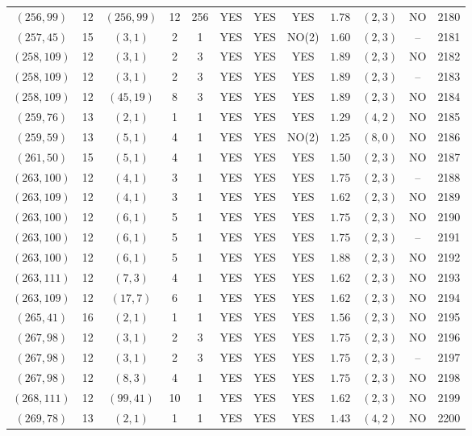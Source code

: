 \begin{longtable}{|c|c|c|c|c|c|c|c|c|c|c|c|}
$(256,99)$ & 12 & $(256,99)$ & 12 & 256 & YES & YES & YES & $1.78$ & $(2,3)$ & NO & 2180\\
$(257,45)$ & 15 & $(3,1)$ & 2 & 1 & YES & YES & NO(2) & $1.60$ & $(2,3)$ & -- & 2181\\
$(258,109)$ & 12 & $(3,1)$ & 2 & 3 & YES & YES & YES & $1.89$ & $(2,3)$ & NO & 2182\\
$(258,109)$ & 12 & $(3,1)$ & 2 & 3 & YES & YES & YES & $1.89$ & $(2,3)$ & -- & 2183\\
$(258,109)$ & 12 & $(45,19)$ & 8 & 3 & YES & YES & YES & $1.89$ & $(2,3)$ & NO & 2184\\
$(259,76)$ & 13 & $(2,1)$ & 1 & 1 & YES & YES & YES & $1.29$ & $(4,2)$ & NO & 2185\\
$(259,59)$ & 13 & $(5,1)$ & 4 & 1 & YES & YES & NO(2) & $1.25$ & $(8,0)$ & NO & 2186\\
$(261,50)$ & 15 & $(5,1)$ & 4 & 1 & YES & YES & YES & $1.50$ & $(2,3)$ & NO & 2187\\
$(263,100)$ & 12 & $(4,1)$ & 3 & 1 & YES & YES & YES & $1.75$ & $(2,3)$ & -- & 2188\\
$(263,109)$ & 12 & $(4,1)$ & 3 & 1 & YES & YES & YES & $1.62$ & $(2,3)$ & NO & 2189\\
$(263,100)$ & 12 & $(6,1)$ & 5 & 1 & YES & YES & YES & $1.75$ & $(2,3)$ & NO & 2190\\
$(263,100)$ & 12 & $(6,1)$ & 5 & 1 & YES & YES & YES & $1.75$ & $(2,3)$ & -- & 2191\\
$(263,100)$ & 12 & $(6,1)$ & 5 & 1 & YES & YES & YES & $1.88$ & $(2,3)$ & NO & 2192\\
$(263,111)$ & 12 & $(7,3)$ & 4 & 1 & YES & YES & YES & $1.62$ & $(2,3)$ & NO & 2193\\
$(263,109)$ & 12 & $(17,7)$ & 6 & 1 & YES & YES & YES & $1.62$ & $(2,3)$ & NO & 2194\\
$(265,41)$ & 16 & $(2,1)$ & 1 & 1 & YES & YES & YES & $1.56$ & $(2,3)$ & NO & 2195\\
$(267,98)$ & 12 & $(3,1)$ & 2 & 3 & YES & YES & YES & $1.75$ & $(2,3)$ & NO & 2196\\
$(267,98)$ & 12 & $(3,1)$ & 2 & 3 & YES & YES & YES & $1.75$ & $(2,3)$ & -- & 2197\\
$(267,98)$ & 12 & $(8,3)$ & 4 & 1 & YES & YES & YES & $1.75$ & $(2,3)$ & NO & 2198\\
$(268,111)$ & 12 & $(99,41)$ & 10 & 1 & YES & YES & YES & $1.62$ & $(2,3)$ & NO & 2199\\
$(269,78)$ & 13 & $(2,1)$ & 1 & 1 & YES & YES & YES & $1.43$ & $(4,2)$ & NO & 2200\\

\end{longtable}
